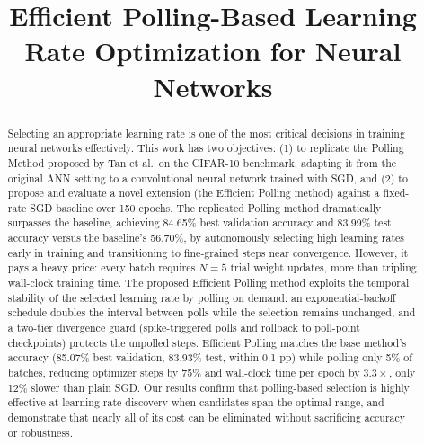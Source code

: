 \documentclass[conference]{IEEEtran}
\begin{document}
\title{Efficient Polling-Based Learning Rate Optimization for Neural Networks}

\author{
\and
{}
}

\maketitle

\begin{abstract}
Selecting an appropriate learning rate is one of the most critical decisions in training neural networks effectively. This work has two objectives: (1) to replicate the Polling Method proposed by Tan et al.\ on the CIFAR-10 benchmark, adapting it from the original ANN setting to a convolutional neural network trained with SGD, and (2) to propose and evaluate a novel extension (the Efficient Polling method) against a fixed-rate SGD baseline over 150 epochs. The replicated Polling method dramatically surpasses the baseline, achieving 84.65\% best validation accuracy and 83.99\% test accuracy versus the baseline's 56.70\%, by autonomously selecting high learning rates early in training and transitioning to fine-grained steps near convergence. However, it pays a heavy price: every batch requires $N=5$ trial weight updates, more than tripling wall-clock training time. The proposed Efficient Polling method exploits the temporal stability of the selected learning rate by polling on demand: an exponential-backoff schedule doubles the interval between polls while the selection remains unchanged, and a two-tier divergence guard (spike-triggered polls and rollback to poll-point checkpoints) protects the unpolled steps. Efficient Polling matches the base method's accuracy (85.07\% best validation, 83.93\% test, within 0.1 pp) while polling only 5\% of batches, reducing optimizer steps by 75\% and wall-clock time per epoch by $3.3\times$, only 12\% slower than plain SGD. Our results confirm that polling-based selection is highly effective at learning rate discovery when candidates span the optimal range, and demonstrate that nearly all of its cost can be eliminated without sacrificing accuracy or robustness.
\end{abstract}
\end{document}
